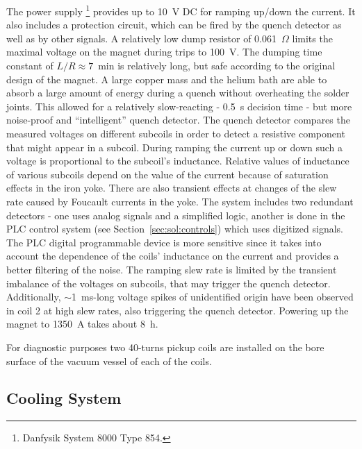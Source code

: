 The power supply%
\footnote{Danfysik System 8000 Type 854.}
provides up to 10~V DC for ramping up/down the current. It also
includes a protection circuit, which can be fired by the quench
detector as well as by other signals.  A relatively low dump resistor
of 0.061~$\Omega$ limits the maximal voltage on the magnet during
trips to 100~V. The dumping time constant of $L/R \approx 7$~min is
relatively long, but safe according to the original design of the
magnet. A large copper mass and the helium bath are able to absorb a
large amount of energy during a quench without overheating the solder
joints. This allowed for a relatively slow-reacting - 0.5~s decision
time - but more noise-proof and ``intelligent'' quench detector.  The
quench detector compares the measured voltages on different subcoils
in order to detect a resistive component that might appear in a
subcoil.
During ramping the current up or down such a voltage is proportional
to the subcoil's inductance.  Relative values of inductance of various
subcoils depend on the value of the current because of saturation
effects in the iron yoke. There are also transient effects at changes
of the slew rate caused by Foucault currents in the yoke.
The system includes two redundant detectors - one uses analog signals
and a simplified logic, another is done in the PLC control system (see
Section~\ref{sec:sol:controls}) which uses digitized signals. The PLC
digital programmable device is more sensitive since it takes into
account the dependence of the coils' inductance on the current and
provides a better filtering of the noise.  The ramping slew rate is
limited by the transient imbalance of the voltages on subcoils, that
may trigger the quench detector. Additionally, $\sim$1~ms-long voltage
spikes of unidentified origin have been observed in coil 2 at high
slew rates, also triggering the quench detector. Powering up the
magnet to 1350~A takes about 8~h.

For diagnostic purposes two 40-turns pickup coils are installed on the bore
surface of the vacuum vessel of each of the coils. 

\subsection[Cooling System]{
   Cooling System
   \label{sec:sol:cryo}
}

